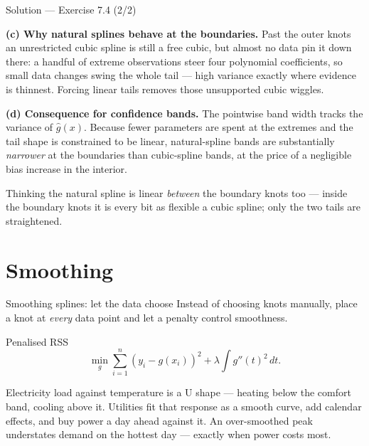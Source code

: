 \documentclass[aspectratio=169,11pt]{beamer}
\begin{document}
\begin{frame}{Solution --- Exercise 7.4 (2/2)}
\begin{solutionbox}
\textbf{(c) Why natural splines behave at the boundaries.} Past the outer knots an unrestricted cubic spline is still a free cubic, but almost no data pin it down there: a handful of extreme observations steer four polynomial coefficients, so small data changes swing the whole tail --- high variance exactly where evidence is thinnest. Forcing linear tails removes those unsupported cubic wiggles.

\medskip
\textbf{(d) Consequence for confidence bands.} The pointwise band width tracks the variance of $\hat g(x)$. Because fewer parameters are spent at the extremes and the tail shape is constrained to be linear, natural-spline bands are substantially \emph{narrower} at the boundaries than cubic-spline bands, at the price of a negligible bias increase in the interior.
\end{solutionbox}
\begin{mistake}
Thinking the natural spline is linear \emph{between} the boundary knots too --- inside the boundary knots it is every bit as flexible a cubic spline; only the two tails are straightened.
\end{mistake}
\end{frame}







\section{Smoothing}

\begin{frame}{Smoothing splines: let the data choose}
  Instead of choosing knots manually, place a knot at \emph{every}
  data point and let a penalty control smoothness.
  \begin{block}{Penalised RSS}
    \[
      \boxed{\;
        \min_{g} \sum_{i=1}^n (y_i - g(x_i))^2 +
        \lambda \int g''(t)^2\,dt.
      \;}
    \]
  \end{block}
  \begin{industry}
    Electricity load against temperature is a U shape --- heating below the comfort band, cooling above it. Utilities fit that response as a smooth curve, add calendar effects, and buy power a day ahead against it. An over-smoothed peak understates demand on the hottest day --- exactly when power costs most.
  \end{industry}
\end{frame}
\end{document}
